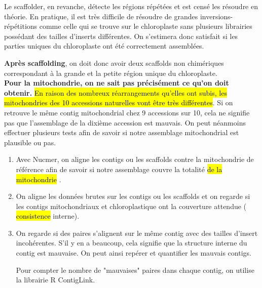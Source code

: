 \documentclass[a4paper]{article}
\newcommand{\rewrite}[1]{\todo[color=green!40]{#1}}
\newcommand{\hlrewrite}[2]{\sethlcolor{green} \hl{#1} \rewrite{#2}}
\begin{document}
Le scaffolder, en revanche, détecte les régions répétées et est censé les résoudre en théorie. En pratique, il est très difficile de résoudre de grandes inversions-répétitions comme celle qui se trouve sur le chloroplaste sans plusieurs librairies possédant des tailles d'inserts différentes. On s'estimera donc satisfait si les parties uniques du chloroplaste ont été correctement assemblées.

\textbf{Après scaffolding}, on doit donc avoir deux scaffolds non chimériques correspondant à la grande et la petite région unique du chloroplaste. \\

\textbf{Pour la mitochondrie, on ne sait pas précisément ce qu'on doit obtenir.} \hl{En raison des nombreux réarrangements qu'elles ont subis, les mitochondries des 10 accessions naturelles vont être très différentes}. \cite{arrieta2009diversity} Si on retrouve le même contig mitochondrial chez 9 accessions sur 10, cela ne signifie pas que l'assemblage de la dixième accession est mauvais. On peut néanmoins effectuer plusieurs tests afin de savoir si notre assemblage mitochondrial est plausible ou pas. 

\begin{enumerate}
	\item Avec Nucmer, on aligne les contigs ou les scaffolds contre la mitochondrie de référence afin de savoir si notre assemblage couvre la totalité \hlrewrite{de la mitochondrie}{du génome}. 

	\item On aligne les données brutes sur les contigs ou les scaffolds et on regarde si les contigs mitochondriaux et chloroplastique ont la couverture attendue (\hlrewrite{consistence}{consistance} interne).

\item On regarde si des paires s'alignent sur le même contig avec des tailles d'insert incohérentes. S'il y en a beaucoup, cela signifie que la structure interne du contig est mauvaise. On peut ainsi repérer et quantifier les mauvais contigs.

Pour compter le nombre de "mauvaises" paires dans chaque contig, on utilise la librairie R ContigLink. 

\end{enumerate}
\end{document}
